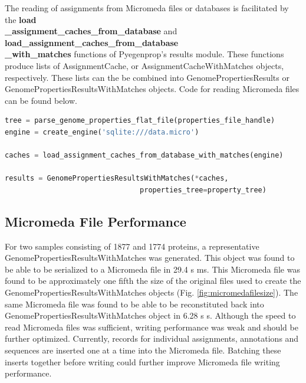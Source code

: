 The reading of assignments from Micromeda files or databases is facilitated by the \textbf{load\\ \_assignment\_caches\_from\_database} and \textbf{load\_assignment\_caches\_from\_database \\ \_with\_matches} functions of Pyegenprop's results module. These functions produce lists of AssignmentCache, or AssignmentCacheWithMatches objects, respectively. These lists can the be combined into GenomePropertiesResults or GenomePropertiesResultsWithMatches objects. Code for reading Micromeda files can be found below.

\begin{lstlisting}[language=Python]  
tree = parse_genome_properties_flat_file(properties_file_handle)
engine = create_engine('sqlite:///data.micro')

caches = load_assignment_caches_from_database_with_matches(engine)

results = GenomePropertiesResultsWithMatches(*caches,          
                                properties_tree=property_tree)
\end{lstlisting}

\subsection{Micromeda File Performance} \label{micromeda-file-performance}

For two samples consisting of 1877 and 1774 proteins, a representative GenomePropertiesResultsWithMatches was generated. This object was found to be able to be serialized to a Micromeda file in 29.4 s  ms. This Micromeda file was found to be approximately one fifth the size of the original files used to create the GenomePropertiesResultsWithMatches objects (Fig. \ref{fig:micromedafilesize}). The same Micromeda file was found to be able to be reconstituted back into GenomePropertiesResultsWithMatches object in 6.28 s  s. Although the speed to read Micromeda files was sufficient, writing performance was weak and should be further optimized. Currently, records for individual assignments, annotations and sequences are inserted one at a time into the Micromeda file. Batching these inserts together before writing could further improve Micromeda file writing performance.


